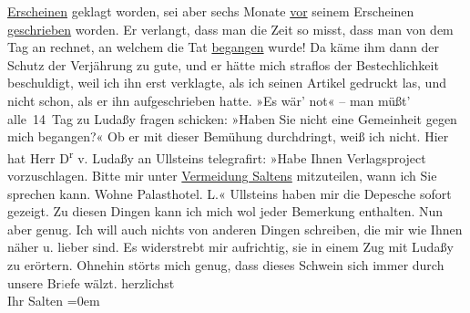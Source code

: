 \begin{ledgroupsized}[t]{13cm}
                  \uline{Erscheinen} geklagt worden, sei aber sechs Monate
                  \uline{vor} seinem Erscheinen \uline{geschrieben} worden. Er verlangt, dass man die Zeit so misst, dass man von
               dem Tag an rechnet, an welchem die Tat \uline{begangen}
               wurde! Da käme ihm dann der Schutz der Verjährung zu gute, und er hätte mich straflos
               der Bestechlichkeit beschuldigt, weil ich ihn erst verklagte, als ich seinen Artikel gedruckt las, und
               nicht schon, als er ihn aufgeschrieben hatte. »Es wär’ not« – man müßt’ alle 14 Tag
               zu Ludaßy fragen schicken: »Haben Sie nicht
               eine Gemeinheit gegen mich begangen?« Ob er mit dieser Bemühung durchdringt, weiß ich
               nicht.\pend
           \pstart
           Hier hat Herr D\textsuperscript{r}{ }v. Ludaßy an Ullsteins telegrafirt: »Habe Ihnen Verlagsproject vorzuschlagen. Bitte mir
               unter \uline{Vermeidung Saltens} mitzuteilen, wann ich Sie
               sprechen kann. Wohne Palasthotel. L.« Ullsteins haben mir die Depesche sofort gezeigt.\pend
           \pstart
           Zu diesen Dingen kann ich mich wol jeder Bemerkung enthalten.\pend
           \pstart
           Nun aber genug. Ich will auch nichts von anderen Dingen {\pb}schreiben, die mir wie Ihnen
               näher u. lieber sind. Es widerstrebt mir aufrichtig, sie in einem Zug mit Ludaßy zu erörtern. Ohnehin störts mich genug,
               dass dieses Schwein sich immer durch unsere Br\textcolor{gray}{i}efe wälzt.\pend
           \pstart
           herzlichst {\\[\baselineskip]}Ihr \spacefill\mbox{Salten}\pend
           \leftskip=0em{}
         
         \endnumbering{}\end{ledgroupsized}  \newcommand{\dateiname}{L03425}\newcommand{\titel}{Felix Salten an Arthur Schnitzler, 17. 5. 1906}\newcommand{\editorInnen}{Martin Anton Müller und Laura Untner}
      